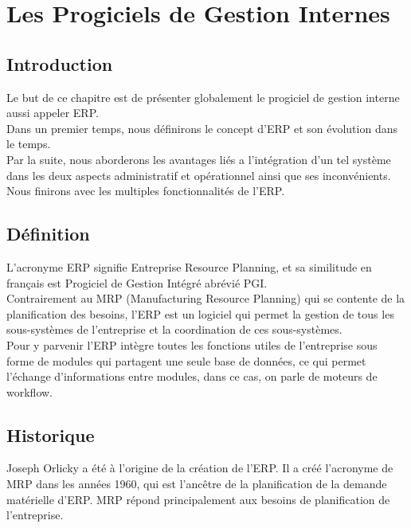 \chapter{Les Progiciels de Gestion Internes}

\section{Introduction}
Le but de ce chapitre est de présenter globalement le progiciel de gestion interne aussi appeler \acs{ERP}.\\

Dans un premier temps, nous définirons le concept d'\acs{ERP} et son évolution dans le temps.\\

Par la suite, nous aborderons les avantages liés a l'intégration d'un tel système dans les deux aspects administratif et opérationnel ainsi que ses inconvénients.\\

Nous finirons avec les multiples fonctionnalités de l'\acs{ERP}.\\

\section{Définition}
L'acronyme \acs{ERP} signifie Entreprise Resource Planning\cite{def-erp}, et sa similitude en français est Progiciel de Gestion Intégré abrévié \acs{PGI}.\\

Contrairement au \acs{MRP} (Manufacturing Resource Planning) qui se contente de la planification des besoins, l'\acs{ERP} est un logiciel qui permet la gestion de tous les sous-systèmes de l'entreprise et la coordination de ces sous-systèmes.\\

Pour y parvenir l’\acs{ERP} intègre toutes les fonctions utiles de l'entreprise sous forme de modules qui partagent une seule base de données, ce qui permet l'échange d'informations entre modules, dans ce cas, on parle de moteurs de workflow.\\

\section{Historique}
Joseph Orlicky a été à l'origine de la création de l'\acs{ERP}.\cite{hist-erp} Il a créé l'acronyme de \acs{MRP} dans les années 1960, qui est l'ancêtre de la planification de la demande matérielle d'\acs{ERP}. \acs{MRP} répond principalement aux besoins de planification de l'entreprise.\\

